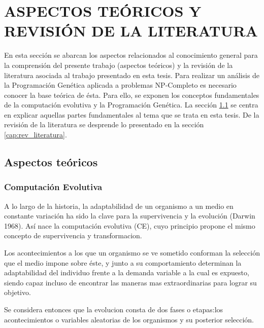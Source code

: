 
\chapter{ASPECTOS TEÓRICOS Y REVISIÓN DE LA LITERATURA}
\label{cap:estado_del_arte}


En esta sección se abarcan los aspectos relacionados al conocimiento general para la comprensión del presente trabajo (aspectos teóricos) y la revisión de la literatura asociada al trabajo presentado en esta tesis.
Para realizar un análisis de la Programación Genética aplicada a problemas NP-Completo es necesario conocer la base teórica de ésta. Para ello, se exponen los conceptos fundamentales de la computación evolutiva y la Programación Genética. La sección \ref{cap:aspectos_teoricos} se centra en explicar aquellas partes fundamentales al tema que se trata en esta tesis. De la revisión de la literatura se desprende lo presentado en la sección \ref{cap:rev_literatura}.

\section{Aspectos teóricos}
\label{cap:aspectos_teoricos}


\subsection{Computación Evolutiva}
\label{cap:ce}

A lo largo de la historia, la adaptabilidad de un organismo a un medio en constante variación ha sido la clave para la supervivencia y la evolución (Darwin 1968). Así nace la computación evolutiva (CE), cuyo principio  propone el mismo concepto de supervivencia y transformacion.

Los acontecimientos a los que un organismo se ve sometido conforman la selección que el medio impone sobre éste, y junto a su comportamiento determinan la adaptabilidad del individuo frente a la demanda variable a la cual es expuesto, siendo capaz incluso de encontrar las maneras mas extraordinarias para lograr su objetivo.

Se considera entonces que la evolucion consta de dos fases o etapas:los acontecimientos o variables aleatorias de los organismos y su posterior selección.

